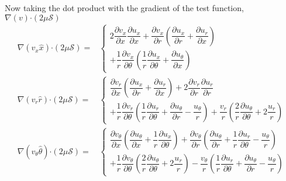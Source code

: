 \documentclass{kthreport}
\newcommand{\bigcdot}{\bm{\cdot}}
\begin{document}
Now taking the dot product with the gradient of the test function, $\nabla (v)\bigcdot(2\mu\mathcal{S})$
\begin{subequations}
\begin{eqnarray}
	\nabla(v_{x}\hat{x})\bigcdot(2\mu\mathcal{S}) = & \left\{
	\begin{split}
	2\dfrac{\partial v_{x}}{\partial x}\dfrac{\partial u_{x}}{\partial x} 
	+ \dfrac{\partial v_{x}}{\partial r}\left(\dfrac{\partial u_{x}}{\partial r} + \dfrac{\partial u_{r}}{\partial x}	\right) \\
	+ \dfrac{1}{r}\dfrac{\partial v_{x}}{\partial \theta}\left(\dfrac{1}{r}\dfrac{\partial u_{x}}{\partial \theta} + \dfrac{\partial u_{\theta}}{\partial x} \right) 
		\end{split} \right. \\
	\nabla(v_{r}\hat{r})\bigcdot(2\mu\mathcal{S}) = & \left\{
	\begin{split}
	\dfrac{\partial v_{r}}{\partial x}\left(\dfrac{\partial u_{x}}{\partial r} + \dfrac{\partial u_{r}}{\partial x} \right)
	+ 2\dfrac{\partial v_{r}}{\partial r}\dfrac{\partial u_{r}}{\partial r} \\
	+ \dfrac{1}{r}\dfrac{\partial v_{r}}{\partial \theta}\left(\dfrac{1}{r}\dfrac{\partial u_{r}}{\partial \theta} + \dfrac{\partial u_{\theta}}{\partial r} - \dfrac{u_{\theta}}{r} \right) 
	+ \dfrac{v_{r}}{r}\left(\dfrac{2}{r}\dfrac{\partial u_{\theta}}{\partial \theta} + 2\dfrac{u_{r}}{r}	\right)
		\end{split}\right. \\
	\nabla(v_{\theta}\hat{\theta})\bigcdot(2\mu\mathcal{S}) =&  \left\{
	\begin{split}
	\dfrac{\partial v_{\theta}}{\partial x}\left(\dfrac{\partial u_{\theta}}{\partial x} + \dfrac{1}{r}\dfrac{\partial u_{x}}{\partial \theta} \right) 
	+ \dfrac{\partial v_{\theta}}{\partial r}\left(\dfrac{\partial u_{\theta}}{\partial r} + \dfrac{1}{r}\dfrac{\partial u_{r}}{\partial \theta} - \dfrac{u_{\theta}}{r}	\right) \\
	+ \dfrac{1}{r}\dfrac{\partial v_{\theta}}{\partial \theta}\left(\dfrac{2}{r}\dfrac{\partial u_{\theta}}{\partial \theta} + 2\dfrac{u_{r}}{r}	\right)
	- \dfrac{v_{\theta}}{r} \left(\dfrac{1}{r}\dfrac{\partial u_{r}}{\partial \theta} + \dfrac{\partial u_{\theta}}{\partial r} - \dfrac{u_{\theta}}{r} \right) 
	\end{split}\right.
\end{eqnarray}
\end{subequations}
\end{document}
